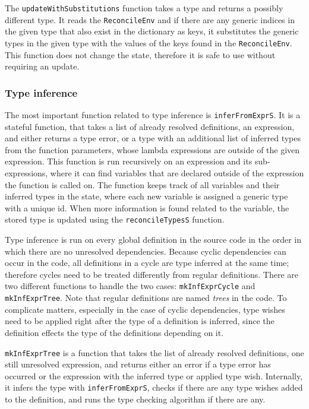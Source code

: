 \documentclass[12pt]{article}
\begin{document}
The \verb$updateWithSubstitutions$ function takes a type and returns a possibly
different type. It reads the \verb$ReconcileEnv$ and if there are any generic
indices in the given type that also exist in the dictionary as keys, it
substitutes the generic types in the given type with the values of the keys
found in the \verb$ReconcileEnv$. This function does not change the state,
therefore it is safe to use without requiring an update.

\subsubsection{Type inference} \label{type-inference}

The most important function related to type inference is \verb$inferFromExprS$.
It is a stateful function, that takes a list of already resolved definitions, an
expression, and either returns a type error, or a type with an additional list
of inferred types from the function parameters, whose lambda expressions are
outside of the given expression. This function is run recursively on an
expression and its sub-expressions, where it can find variables that are
declared outside of the expression the function is called on. The function keeps
track of all variables and their inferred types in the state, where each new
variable is assigned a generic type with a unique id. When more information is
found related to the variable, the stored type is updated using the
\verb$reconcileTypesS$ function.

Type inference is run on every global definition in the source code in the order
in which there are no unresolved dependencies. Because cyclic dependencies can
occur in the code, all definitions in a cycle are type inferred at the same
time; therefore cycles need to be treated differently from regular definitions.
There are two different functions to handle the two cases: \verb$mkInfExprCycle$
and \verb$mkInfExprTree$. Note that regular definitions are named \emph{trees}
in the code. To complicate matters, especially in the case of cyclic
dependencies, type wishes need to be applied right after the type of a
definition is inferred, since the definition effects the type of the definitions
depending on it.

\verb$mkInfExprTree$ is a function that takes the list of already resolved
definitions, one still unresolved expression, and returns either an error if a
type error has occurred or the expression with the inferred type or applied type
wish. Internally, it infers the type with \verb$inferFromExprS$, checks if there
are any type wishes added to the definition, and runs the type checking
algorithm if there are any.
\end{document}

